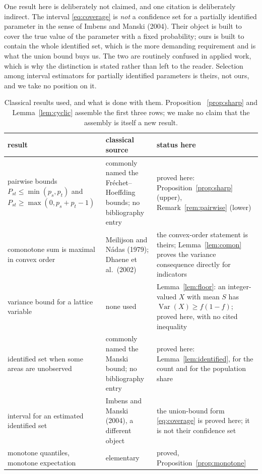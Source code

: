 One result here is deliberately not claimed, and one citation is deliberately indirect. The interval
\eqref{eq:coverage} is \emph{not} a confidence set for a partially identified parameter in the sense of
Imbens and Manski (2004). Their object is built to cover the true value of the parameter with a fixed
probability; ours is built to contain the whole identified set, which is the more demanding requirement and
is what the union bound buys us. The two are routinely confused in applied work, which is why the distinction
is stated rather than left to the reader. Selection among interval estimators for partially identified
parameters is theirs, not ours, and we take no position on it.

\begin{table}[htbp]
\centering
\begin{tabular}{p{}p{}p{}}
\hline
result & classical source & status here \\
\hline
pairwise bounds $P_{st} \le \min(p_s,p_t)$ and $P_{st} \ge \max(0,p_s+p_t-1)$ & commonly named the Fr\'echet--Hoeffding bounds; no bibliography entry & proved here: Proposition~\ref{prop:sharp} (upper), Remark~\ref{rem:pairwise} (lower) \\
comonotone sum is maximal in convex order & Meilijson and N\'adas (1979); Dhaene et al.\ (2002) & the convex-order statement is theirs; Lemma~\ref{lem:comon} proves the variance consequence directly for indicators \\
variance bound for a lattice variable & none used & Lemma~\ref{lem:floor}: an integer-valued $X$ with mean $S$ has $\operatorname{Var}(X) \ge f(1-f)$; proved here, with no cited inequality \\
identified set when some areas are unobserved & commonly named the Manski bound; no bibliography entry & proved here: Lemma~\ref{lem:identified}, for the count and for the population share \\
interval for an estimated identified set & Imbens and Manski (2004), a different object & the union-bound form \eqref{eq:coverage} is proved here; it is not their confidence set \\
monotone quantiles, monotone expectation & elementary & proved, Proposition~\ref{prop:monotone} \\
\hline
\end{tabular}
\caption{Classical results used, and what is done with them.  Proposition~
\ref{prop:sharp} and Lemma~\ref{lem:cyclic} assemble the first three rows; we
make no claim that the assembly is itself a new result.}
\label{tab:attribution}
\end{table}
